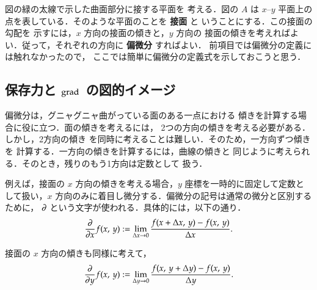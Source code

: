                 図の緑の太線で示した曲面部分に接する平面を
                考える．図の $A$ は $x$--$y$ 平面上の点を表している．そのような平面のことを \textbf{接面} と
                いうことにする．この接面の勾配を
                示すには，$x$ 方向の接面の傾きと，$y$ 方向の
                接面の傾きを考えればよい．従って，それぞれの方向に \textbf{偏微分} すればよい．
                前項目では偏微分の定義には触れなかったので，
                ここでは簡単に偏微分の定義式を示しておこうと思う．

        \subsection{保存力と $\mathrm{grad}\,$ の図的イメージ}
                偏微分は，グニャグニャ曲がっている面のある一点における
                傾きを計算する場合に役に立つ．面の傾きを考えるには，
                2つの方向の傾きを考える必要がある．しかし，2方向の傾き
                を同時に考えることは難しい．そのため，一方向ずつ傾きを
                計算する．一方向の傾きを計算するには，曲線の傾きと
                同じように考えられる．そのとき，残りのもう1方向は定数として
                扱う．

                例えば，接面の $x$ 方向の傾きを考える場合，$y$ 座標を一時的に固定して定数と
                して扱い，$x$ 方向のみに着目し微分する．偏微分の記号は通常の微分と区別するために，
                $\partial$ という文字が使われる．具体的には，以下の通り．
                \begin{align}
                    \frac{\partial }{\partial x}f(x,\,y) := \lim_{\Delta x \to 0} \frac{f(x+\Delta x,\, y) - f(x,\,y)}{\Delta x}.
                \end{align}

                接面の $x$ 方向の傾きも同様に考えて，
                \begin{align}
                    \frac{\partial }{\partial y}f(x,\,y) := \lim_{\Delta y \to 0} \frac{f(x,\,y+\Delta y) - f(x,\,y)}{\Delta y}.
                \end{align}

